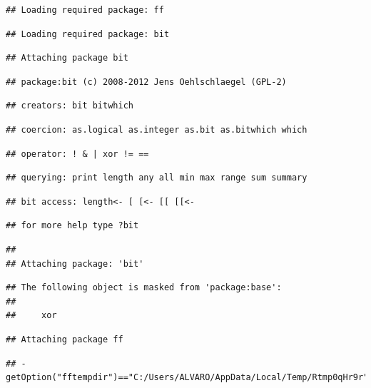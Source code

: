 \documentclass[
]{article}
\begin{document}
\begin{verbatim}
## Loading required package: ff
\end{verbatim}

\begin{verbatim}
## Loading required package: bit
\end{verbatim}

\begin{verbatim}
## Attaching package bit
\end{verbatim}

\begin{verbatim}
## package:bit (c) 2008-2012 Jens Oehlschlaegel (GPL-2)
\end{verbatim}

\begin{verbatim}
## creators: bit bitwhich
\end{verbatim}

\begin{verbatim}
## coercion: as.logical as.integer as.bit as.bitwhich which
\end{verbatim}

\begin{verbatim}
## operator: ! & | xor != ==
\end{verbatim}

\begin{verbatim}
## querying: print length any all min max range sum summary
\end{verbatim}

\begin{verbatim}
## bit access: length<- [ [<- [[ [[<-
\end{verbatim}

\begin{verbatim}
## for more help type ?bit
\end{verbatim}

\begin{verbatim}
## 
## Attaching package: 'bit'
\end{verbatim}

\begin{verbatim}
## The following object is masked from 'package:base':
## 
##     xor
\end{verbatim}

\begin{verbatim}
## Attaching package ff
\end{verbatim}

\begin{verbatim}
## - getOption("fftempdir")=="C:/Users/ALVARO/AppData/Local/Temp/Rtmp0qHr9r"
\end{verbatim}
\end{document}
